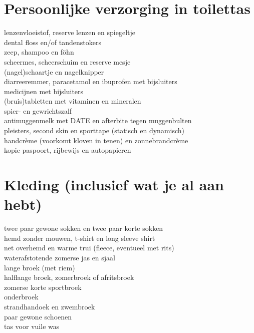 \documentclass[9pt,twocolumn]{memoir}
\begin{document}
\section*{Persoonlijke verzorging in toilettas}%
lenzenvloeistof, reserve lenzen en spiegeltje\\%
dental floss en/of tandenstokers\\%
zeep, shampoo en föhn\\%
scheermes, scheerschuim en reserve mesje\\%
(nagel)schaartje en nagelknipper\\%
diarreeremmer, paracetamol en ibuprofen met bijsluiters\\%
medicijnen met bijsluiters\\%
(bruis)tabletten met vitaminen en mineralen\\%
spier- en gewrichtszalf\\%
antimuggenmelk met DATE en afterbite tegen muggenbulten\\%
pleisters, second skin en sporttape (statisch en dynamisch)\\%
handcrème (voorkomt kloven in tenen) en zonnebrandcrème\\%
kopie paspoort, rijbewijs en autopapieren%

\section*{Kleding (inclusief wat je al aan hebt)}%
twee paar gewone sokken en twee paar korte sokken\\%
hemd zonder mouwen, t-shirt en long sleeve shirt\\%
net overhemd en warme trui (fleece, eventueel met rits)\\%
waterafstotende zomerse jas en sjaal\\%
lange broek (met riem)\\%
halflange broek, zomerbroek of afritsbroek\\%
zomerse korte sportbroek\\%
onderbroek\\%
strandhandoek en zwembroek\\%
paar gewone schoenen\\%
tas voor vuile was%
\end{document}
